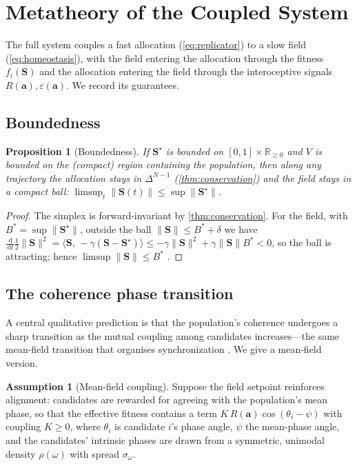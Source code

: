 \documentclass[11pt,a4paper]{article}
\theoremstyle{plain}
\newtheorem{proposition}[theorem]{Proposition}
\theoremstyle{definition}
\newtheorem{assumption}[theorem]{Assumption}
\theoremstyle{remark}
\newcommand{\Rp}{\mathbb{R}_{\ge 0}}
\newcommand{\Unit}{[0,1]}
\newcommand{\simplex}{\Delta}                 %
\newcommand{\field}{\mathbf{S}}               %
\newcommand{\alloc}{\mathbf{a}}               %
\newcommand{\coh}{R}                           %
\newcommand{\inner}[2]{\langle #1,\,#2\rangle}
\newcommand{\norm}[1]{\lVert #1\rVert}
\newcommand{\dd}{\,\mathrm{d}}
\newcommand{\setpt}{\field^{\!\star}}
\begin{document}
\section{Metatheory of the Coupled System}
\label{sec:metatheory}

The full system couples a fast allocation (\cref{eq:replicator}) to a slow field
(\cref{eq:homeostasis}), with the field entering the allocation through the
fitness $f_i(\field)$ and the allocation entering the field through the
interoceptive signals $\coh(\alloc),\varepsilon(\alloc)$. We record its
guarantees.

\subsection{Boundedness}

\begin{proposition}[Boundedness]
\label{prop:bounded}
If $\setpt$ is bounded on $\Unit\times\Rp$ and $V$ is bounded on the (compact)
region containing the population, then along any trajectory the allocation stays
in $\simplex^{N-1}$ (\cref{thm:conservation}) and the field stays in a compact
ball: $\limsup_{t}\norm{\field(t)}\le\sup\norm{\setpt}$.
\end{proposition}
\begin{proof}
The simplex is forward-invariant by \cref{thm:conservation}. For the field, with
$B^\ast=\sup\norm{\setpt}$, outside the ball $\norm{\field}\le B^\ast+\delta$ we
have $\frac{\dd}{\dd t}\tfrac12\norm{\field}^2=\inner{\field}{-\gamma(\field-
\setpt)}\le-\gamma\norm{\field}^2+\gamma\norm{\field}B^\ast<0$, so the ball is
attracting; hence $\limsup\norm{\field}\le B^\ast$ \citep{khalil2002}.
\end{proof}

\subsection{The coherence phase transition}

A central qualitative prediction is that the population's coherence undergoes a
sharp transition as the mutual coupling among candidates increases---the same
mean-field transition that organises synchronization
\citep{kuramoto1984,strogatz2000}. We give a mean-field version.

\begin{assumption}[Mean-field coupling]
\label{ass:meanfield}
Suppose the field setpoint reinforces alignment: candidates are rewarded for
agreeing with the population's mean phase, so that the effective fitness
contains a term $K\,\coh(\alloc)\cos(\theta_i-\psi)$ with coupling $K\ge0$,
where $\theta_i$ is candidate $i$'s phase angle, $\psi$ the mean-phase angle,
and the candidates' intrinsic phases are drawn from a symmetric, unimodal
density $\rho(\omega)$ with spread $\sigma_\omega$.
\end{assumption}
\end{document}
